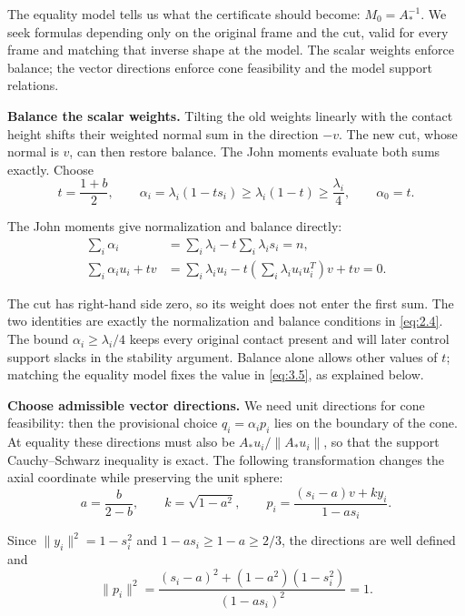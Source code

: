 The equality model tells us what the certificate should become:
$M_0=A_*^{-1}$. We seek formulas depending only on the original frame and the
cut, valid for every frame and matching that inverse shape at the model.
The scalar weights enforce balance; the vector directions enforce cone
feasibility and the model support relations.

\textbf{Balance the scalar weights.} Tilting the old weights linearly with the
contact height shifts their weighted normal sum in the direction $-v$.
The new cut, whose normal is $v$, can then restore balance. The John moments
evaluate both sums exactly. Choose
\begin{equation}\label{eq:3.5}
t=\frac{1+b}{2},\qquad
\alpha_i=\lambda_i(1-ts_i)\ge\lambda_i(1-t)\ge\frac{\lambda_i}{4},
\qquad \alpha_0=t.
\end{equation}

The John moments give normalization and balance directly:
\begin{equation}\label{eq:3.6}
\begin{aligned}
\sum_i\alpha_i
&=\sum_i\lambda_i-t\sum_i\lambda_i s_i=n,\\
\sum_i\alpha_i u_i+tv
&=\sum_i\lambda_i u_i-t\left(\sum_i\lambda_i u_iu_i^T\right)v+tv=0.
\end{aligned}
\end{equation}

The cut has right-hand side zero, so its weight does not enter the first sum.
The two identities are exactly the normalization and balance conditions in
\eqref{eq:2.4}. The bound $\alpha_i\ge\lambda_i/4$ keeps every original contact present
and will later control support slacks in the stability argument.
Balance alone allows other values of $t$; matching the equality model fixes
the value in \eqref{eq:3.5}, as explained below.

\textbf{Choose admissible vector directions.} We need unit directions for cone
feasibility: then the provisional choice $q_i=\alpha_i p_i$ lies on the
boundary of the cone. At equality these directions must also be
$A_*u_i/\|A_*u_i\|$, so that the support Cauchy--Schwarz inequality is exact.
The following transformation changes the axial coordinate while preserving
the unit sphere:
\begin{equation}\label{eq:3.7}
a=\frac b{2-b},\qquad k=\sqrt{1-a^2},\qquad
p_i=\frac{(s_i-a)v+ky_i}{1-as_i}.
\end{equation}

Since $\|y_i\|^2=1-s_i^2$ and $1-as_i\ge1-a\ge2/3$, the directions are well defined and
\begin{equation}\label{eq:3.8}
\|p_i\|^2
=\frac{(s_i-a)^2+(1-a^2)(1-s_i^2)}{(1-as_i)^2}=1.
\end{equation}

